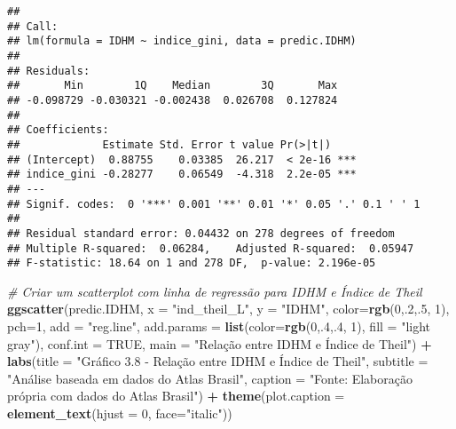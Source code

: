 \documentclass[
]{article}
\newenvironment{Shaded}{\begin{snugshade}}{\end{snugshade}}
\newcommand{\AttributeTok}[1]{\textcolor[rgb]{0.13,0.29,0.53}{#1}}
\newcommand{\CommentTok}[1]{\textcolor[rgb]{0.56,0.35,0.01}{\textit{#1}}}
\newcommand{\ConstantTok}[1]{\textcolor[rgb]{0.56,0.35,0.01}{#1}}
\newcommand{\DecValTok}[1]{\textcolor[rgb]{0.00,0.00,0.81}{#1}}
\newcommand{\FunctionTok}[1]{\textcolor[rgb]{0.13,0.29,0.53}{\textbf{#1}}}
\newcommand{\NormalTok}[1]{#1}
\newcommand{\SpecialCharTok}[1]{\textcolor[rgb]{0.81,0.36,0.00}{\textbf{#1}}}
\newcommand{\StringTok}[1]{\textcolor[rgb]{0.31,0.60,0.02}{#1}}
\begin{document}
\begin{verbatim}
## 
## Call:
## lm(formula = IDHM ~ indice_gini, data = predic.IDHM)
## 
## Residuals:
##       Min        1Q    Median        3Q       Max 
## -0.098729 -0.030321 -0.002438  0.026708  0.127824 
## 
## Coefficients:
##             Estimate Std. Error t value Pr(>|t|)    
## (Intercept)  0.88755    0.03385  26.217  < 2e-16 ***
## indice_gini -0.28277    0.06549  -4.318  2.2e-05 ***
## ---
## Signif. codes:  0 '***' 0.001 '**' 0.01 '*' 0.05 '.' 0.1 ' ' 1
## 
## Residual standard error: 0.04432 on 278 degrees of freedom
## Multiple R-squared:  0.06284,    Adjusted R-squared:  0.05947 
## F-statistic: 18.64 on 1 and 278 DF,  p-value: 2.196e-05
\end{verbatim}

\begin{Shaded}
\begin{Highlighting}[]
\CommentTok{\# Criar um scatterplot com linha de regressão para IDHM e Índice de Theil}
\FunctionTok{ggscatter}\NormalTok{(predic.IDHM, }\AttributeTok{x =} \StringTok{"ind\_theil\_L"}\NormalTok{, }\AttributeTok{y =} \StringTok{"IDHM"}\NormalTok{, }
          \AttributeTok{color=}\FunctionTok{rgb}\NormalTok{(}\DecValTok{0}\NormalTok{,.}\DecValTok{2}\NormalTok{,.}\DecValTok{5}\NormalTok{,  }\DecValTok{1}\NormalTok{), }\AttributeTok{pch=}\DecValTok{1}\NormalTok{, }\AttributeTok{add =} \StringTok{"reg.line"}\NormalTok{, }
          \AttributeTok{add.params =} \FunctionTok{list}\NormalTok{(}\AttributeTok{color=}\FunctionTok{rgb}\NormalTok{(}\DecValTok{0}\NormalTok{,.}\DecValTok{4}\NormalTok{,.}\DecValTok{4}\NormalTok{,  }\DecValTok{1}\NormalTok{), }\AttributeTok{fill =} \StringTok{"light gray"}\NormalTok{), }
          \AttributeTok{conf.int =} \ConstantTok{TRUE}\NormalTok{, }\AttributeTok{main =} \StringTok{"Relação entre IDHM e Índice de Theil"}\NormalTok{) }\SpecialCharTok{+}
  \FunctionTok{labs}\NormalTok{(}\AttributeTok{title =} \StringTok{"Gráfico 3.8 {-} Relação entre IDHM e Índice de Theil"}\NormalTok{,}
       \AttributeTok{subtitle =} \StringTok{"Análise baseada em dados do Atlas Brasil"}\NormalTok{,}
       \AttributeTok{caption =} \StringTok{"Fonte: Elaboração própria com dados do Atlas Brasil"}\NormalTok{) }\SpecialCharTok{+}
  \FunctionTok{theme}\NormalTok{(}\AttributeTok{plot.caption =} \FunctionTok{element\_text}\NormalTok{(}\AttributeTok{hjust =} \DecValTok{0}\NormalTok{, }\AttributeTok{face=}\StringTok{"italic"}\NormalTok{))}
\end{Highlighting}
\end{Shaded}
\end{document}
